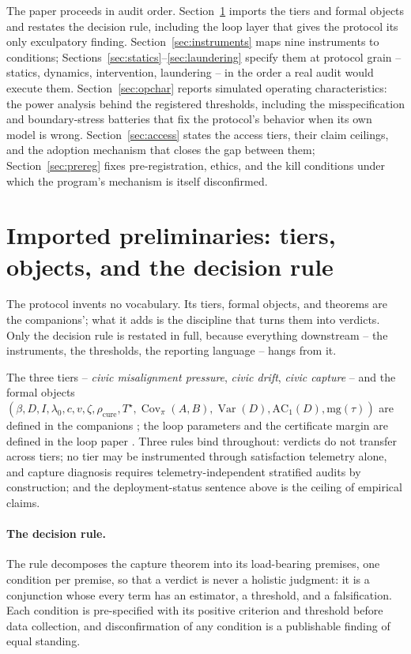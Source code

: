 \documentclass[11pt]{article}
\theoremstyle{definition}
\theoremstyle{remark}
\numberwithin{equation}{section}
\DeclareMathOperator{\Var}{Var}
\DeclareMathOperator{\Cov}{Cov}
\begin{document}
The paper proceeds in audit order. Section~\ref{sec:prelim} imports the tiers and formal objects and restates the decision rule, including the loop layer that gives the protocol its only exculpatory finding. Section~\ref{sec:instruments} maps nine instruments to conditions; Sections~\ref{sec:statics}--\ref{sec:laundering} specify them at protocol grain -- statics, dynamics, intervention, laundering -- in the order a real audit would execute them. Section~\ref{sec:opchar} reports simulated operating characteristics: the power analysis behind the registered thresholds, including the misspecification and boundary-stress batteries that fix the protocol's behavior when its own model is wrong. Section~\ref{sec:access} states the access tiers, their claim ceilings, and the adoption mechanism that closes the gap between them; Section~\ref{sec:prereg} fixes pre-registration, ethics, and the kill conditions under which the program's mechanism is itself disconfirmed.

\section{Imported preliminaries: tiers, objects, and the decision rule}\label{sec:prelim}

The protocol invents no vocabulary. Its tiers, formal objects, and theorems are the companions'; what it adds is the discipline that turns them into verdicts. Only the decision rule is restated in full, because everything downstream -- the instruments, the thresholds, the reporting language -- hangs from it.

The three tiers -- \emph{civic misalignment pressure}, \emph{civic drift}, \emph{civic capture} -- and the formal objects $(\beta, D, I, \lambda_0, c, v, \zeta, \rho_{\mathrm{cure}}, T^\star, \Cov_\pi(A,B), \Var(D), \mathrm{AC}_1(D), \mathrm{mg}(\tau))$ are defined in the companions \citep{hofheinz2026civic,hofheinz2026drift}; the loop parameters and the certificate margin are defined in the loop paper \citep{hofheinz2026loops}. Three rules bind throughout: verdicts do not transfer across tiers; no tier may be instrumented through satisfaction telemetry alone, and capture diagnosis requires telemetry-independent stratified audits by construction; and the deployment-status sentence above is the ceiling of empirical claims.

\paragraph{The decision rule.} The rule decomposes the capture theorem into its load-bearing premises, one condition per premise, so that a verdict is never a holistic judgment: it is a conjunction whose every term has an estimator, a threshold, and a falsification. Each condition is pre-specified with its positive criterion and threshold before data collection, and disconfirmation of any condition is a publishable finding of equal standing.
\end{document}
